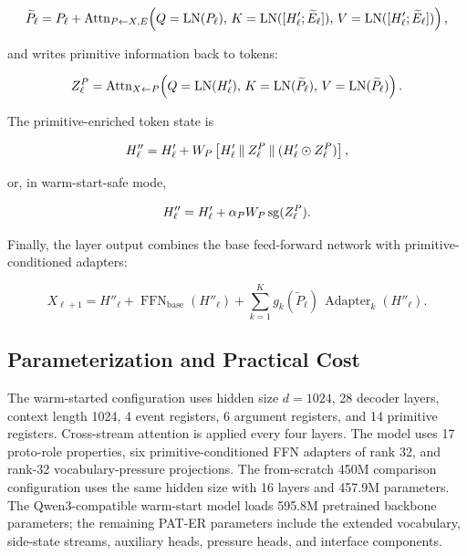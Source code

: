\begin{equation}
\widetilde{P}_\ell =
P_\ell +
\operatorname{Attn}_{P \leftarrow X,E}\!\left(
Q=\operatorname{LN}(P_\ell),\,
K=\operatorname{LN}([H'_\ell; \widetilde{E}_\ell]),\,
V=\operatorname{LN}([H'_\ell; \widetilde{E}_\ell])
\right),
\label{eq:primitive_read}
\end{equation}

and writes primitive information back to tokens:

\begin{equation}
Z^P_\ell =
\operatorname{Attn}_{X \leftarrow P}\!\left(
Q=\operatorname{LN}(H'_\ell),\,
K=\operatorname{LN}(\widetilde{P}_\ell),\,
V=\operatorname{LN}(\widetilde{P}_\ell)
\right).
\label{eq:primitive_write}
\end{equation}

The primitive-enriched token state is

\begin{equation}
H''_\ell =
H'_\ell + W_P\left[H'_\ell \mathbin{\Vert} Z^P_\ell \mathbin{\Vert}
                  (H'_\ell \odot Z^P_\ell)\right],
\label{eq:primitive_injection}
\end{equation}

or, in warm-start-safe mode,

\begin{equation}
H''_\ell = H'_\ell + \alpha_P W_P \operatorname{sg}(Z^P_\ell).
\label{eq:warmstart_primitive_injection}
\end{equation}

Finally, the layer output combines the base feed-forward network with
primitive-conditioned adapters:

\begin{equation}
X_{\ell+1} =
H''_\ell +
\operatorname{FFN}_{\mathrm{base}}(H''_\ell) +
\sum_{k=1}^{K} g_k(\widetilde{P}_\ell)\,
\operatorname{Adapter}_k(H''_\ell).
\label{eq:ffn_adapters}
\end{equation}

\subsection{Parameterization and Practical Cost}
\label{subsec:parameter_cost}

The warm-started configuration uses hidden size $d=1024$, 28 decoder layers,
context length 1024, 4 event registers, 6 argument registers, and 14 primitive
registers. Cross-stream attention is applied every four layers. The model uses
17 proto-role properties, six primitive-conditioned FFN adapters of rank 32, and
rank-32 vocabulary-pressure projections. The from-scratch 450M comparison
configuration uses the same hidden size with 16 layers and 457.9M parameters.
The Qwen3-compatible warm-start model loads 595.8M pretrained backbone
parameters; the remaining PAT-ER parameters include the extended vocabulary,
side-state streams, auxiliary heads, pressure heads, and interface components.

